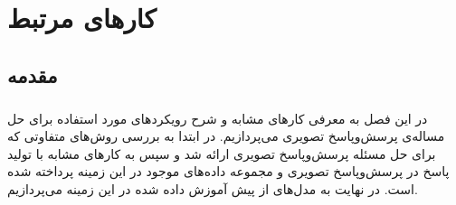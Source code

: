 
\chapter{کارهای مرتبط} \label{ch:related}
\thispagestyle{empty}


\section{مقدمه}
\label{sec:intro}
\paragraph{}
{
    در این فصل به معرفی کارهای مشابه و شرح
    رویکردهای مورد استفاده برای حل مساله‌ی پرسش‌و‌پاسخ تصویری می‌پردازیم.
    در ابتدا به بررسی روش‌های متفاوتی که برای حل مسئله پرسش‌وپاسخ تصویری 
    ارائه شد و سپس به کارهای مشابه با تولید پاسخ در پرسش‌وپاسخ تصویری
    و مجموعه داده‌های موجود در این زمینه پرداخته ‌شده است. در نهایت به 
    مدل‌های از پیش‌ آموزش داده شده در این زمینه می‌پردازیم.  
}


